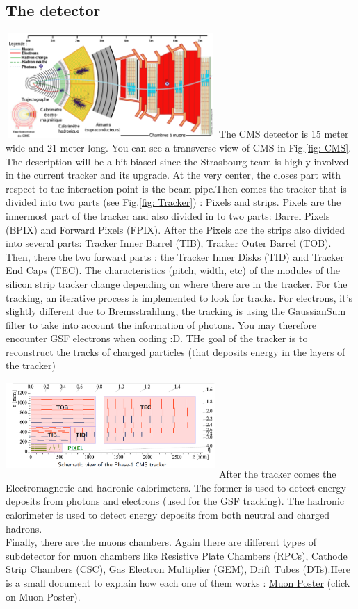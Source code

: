 \documentclass[reprint, a4paper, nofootinbib, amsmath, amssymb, aps]{revtex4-1}
\begin{document}
    \subsection{The detector}
    \includegraphics[height=4cm, width=8cm, trim= 0cm 0cm 0cm 0cm,clip]{Images/cmsAll.png}
    \label{fig: CMS}
    The CMS detector is 15 meter wide and 21 meter long. You can see a transverse view of CMS in Fig.\ref{fig: CMS}. The description will be a bit biased since the Strasbourg team is highly involved in the current tracker and its upgrade. At the very center, the closes part with respect to the interaction point is the beam pipe.Then comes the tracker that is divided into two parts (see Fig.\ref{fig: Tracker}) : Pixels and strips. Pixels are the innermost part of the tracker and also divided in to two parts: Barrel Pixels (BPIX) and Forward Pixels (FPIX). After the Pixels are the strips also divided into several parts: Tracker Inner Barrel (TIB), Tracker Outer Barrel (TOB). Then, there the two forward parts : the Tracker Inner Disks (TID) and Tracker End Caps (TEC). The characteristics (pitch, width, etc) of the modules of the silicon strip tracker change depending on where there are in the tracker.
    For the tracking, an iterative process is implemented to look for tracks. For electrons, it's slightly different due to Bremsstrahlung, the tracking is using the GaussianSum filter to take into account the information of photons. You may therefore encounter GSF electrons when coding :D. THe goal of the tracker is to reconstruct the tracks of charged particles (that deposits energy in the layers of the tracker)\\
    \includegraphics[height=4cm, width=8cm, trim= 0cm 0cm 0cm 0cm,clip]{Images/CMSTracker.png}\label{fig: Tracker}
    After the tracker comes the Electromagnetic and hadronic calorimeters. The former is used to detect energy deposits from photons and electrons (used for the GSF tracking). The hadronic calorimeter is used to detect energy deposits from both neutral and charged hadrons. \\
    Finally, there are the muons chambers. Again there are different types of subdetector for muon chambers like Resistive Plate Chambers (RPCs), Cathode Strip Chambers (CSC), Gas Electron Multiplier (GEM), Drift Tubes (DTs).Here is a small document to explain how each one of them works : \href{https://cds.cern.ch/record/2698492/files/Poster-2019-989.pdf}{Muon Poster} (click on Muon Poster).
\end{document}
